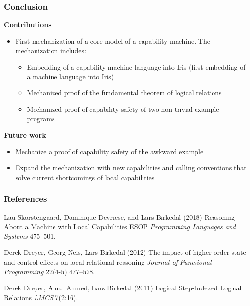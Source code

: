 \documentclass{beamer}
\begin{document}
\begin{frame}
\frametitle{Conclusion}


\textbf{Contributions}
\begin{itemize}
	\item First mechanization of a core model of a capability machine. The mechanization includes: 
		\begin{itemize}
			\item Embedding of a capability machine language into Iris (first embedding of a machine language into Iris)
			\item Mechanized proof of the fundamental theorem of logical relations 
			\item Mechanized proof of capability safety of two non-trivial example programs 
		\end{itemize}
\end{itemize}
\textbf{Future work}
\begin{itemize}
	\item Mechanize a proof of capability safety of the awkward example
	\item Expand the mechanization with new capabilities and calling conventions that solve current shortcomings of local capabilities
\end{itemize}

\end{frame}



\begin{frame}
\frametitle{References}
\footnotesize{
\begin{thebibliography}{99} %
 Lau Skorstengaard, 
Dominique Devriese, 
and Lars Birkedal (2018)
\newblock Reasoning About a Machine with Local Capabilities
\newblock ESOP \emph{Programming Languages and Systems} 475--501.

 Derek Dreyer, Georg Neis, Lars Birkedal (2012)
\newblock The impact of higher-order state and control effects on local relational reasoning
\newblock \emph{Journal of Functional Programming} 22(4-5) 477--528.

 Derek Dreyer, Amal Ahmed, Lars Birkedal (2011)
\newblock Logical Step-Indexed Logical Relations
\newblock \emph{LMCS} 7(2:16).

\end{thebibliography}
}
\end{frame}
\end{document}
